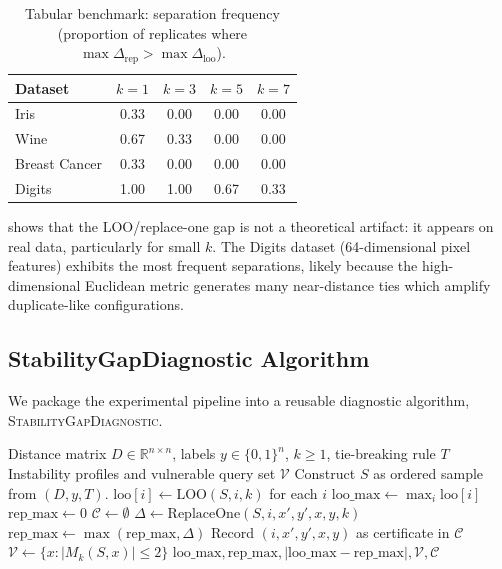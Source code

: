\begin{table}[t]
    \centering
    \caption{Tabular benchmark: separation frequency (proportion of replicates
    where $\max\Delta_{\mathrm{rep}} > \max\Delta_{\mathrm{loo}}$).}
    \label{tab:tabular-separation}
    \small
    \begin{tabular}{lcccc}
    \toprule
    Dataset & $k=1$ & $k=3$ & $k=5$ & $k=7$ \\
    \midrule
    Iris          & 0.33 & 0.00 & 0.00 & 0.00 \\
    Wine          & 0.67 & 0.33 & 0.00 & 0.00 \\
    Breast Cancer & 0.33 & 0.00 & 0.00 & 0.00 \\
    Digits        & 1.00 & 1.00 & 0.67 & 0.33 \\
    \bottomrule
    \end{tabular}
\end{table}

 shows that the LOO/replace-one gap is not a
theoretical artifact: it appears on real data, particularly for small $k$.
The Digits dataset (64-dimensional pixel features) exhibits the most frequent
separations, likely because the high-dimensional Euclidean metric generates
many near-distance ties which amplify duplicate-like configurations.

\subsection{StabilityGapDiagnostic Algorithm}
\label{sec:diagnostic-algorithm}

We package the experimental pipeline into a reusable diagnostic algorithm,
\textsc{StabilityGapDiagnostic}.

\begin{algorithm}[t]
\caption{\textsc{StabilityGapDiagnostic}}
\label{alg:diagnostic}
\begin{algorithmic}[1]
\Require Distance matrix $D \in \mathbb{R}^{n \times n}$, labels
    $y \in \{0,1\}^n$, $k \ge 1$, tie-breaking rule $T$
\Ensure Instability profiles and vulnerable query set $\mathcal{V}$
\State Construct $S$ as ordered sample from $(D, y, T)$.
\State $\text{loo}[i] \gets \text{LOO}(S, i, k)$ for each $i$
\State $\text{loo\_max} \gets \max_i \text{loo}[i]$
\State $\text{rep\_max} \gets 0$
\State $\mathcal{C} \gets \emptyset$ 
            \State $\Delta \gets \text{ReplaceOne}(S, i, x', y', x, y, k)$
            \State $\text{rep\_max} \gets \max(\text{rep\_max}, \Delta)$
                \State Record $(i, x', y', x, y)$ as certificate in $\mathcal{C}$
            \EndIf
        \EndFor
    \EndFor
\EndFor
\State $\mathcal{V} \gets \{x : |M_k(S, x)| \le 2\}$ 
\State \Return $\text{loo\_max}, \text{rep\_max}, |\text{loo\_max} - \text{rep\_max}|, \mathcal{V}, \mathcal{C}$
\end{algorithmic}
\end{algorithm}

